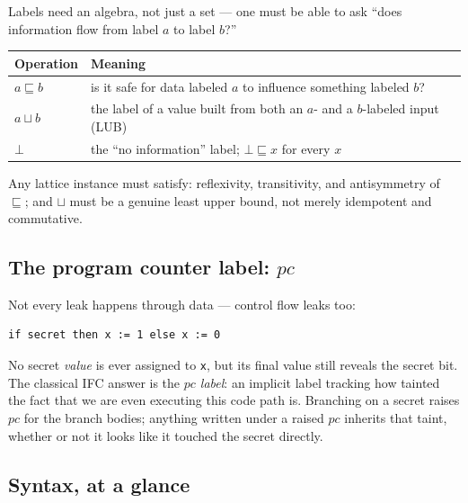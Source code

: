\documentclass[11pt, a4paper]{article}
\newcommand{\flowsto}{\sqsubseteq}
\newcommand{\joinop}{\sqcup}
\begin{document}
Labels need an algebra, not just a set --- one must be able to ask ``does
information flow from label $a$ to label $b$?''

\begin{center}
\begin{tabular}{@{}ll@{}}
\toprule
Operation & Meaning \\
\midrule
$a \flowsto b$ & is it safe for data labeled $a$ to influence something labeled $b$? \\
$a \joinop b$ & the label of a value built from both an $a$- and a $b$-labeled input (LUB) \\
$\bot$ & the ``no information'' label; $\bot \flowsto x$ for every $x$ \\
\bottomrule
\end{tabular}
\end{center}

Any lattice instance must satisfy: reflexivity, transitivity, and
antisymmetry of $\flowsto$; and $\joinop$ must be a genuine least upper
bound, not merely idempotent and commutative.

\subsection{The program counter label: \texorpdfstring{$pc$}{pc}}

Not every leak happens through data --- control flow leaks too:

\begin{lstlisting}
if secret then x := 1 else x := 0
\end{lstlisting}

No secret \emph{value} is ever assigned to \texttt{x}, but its final value
still reveals the secret bit. The classical IFC answer is the \emph{$pc$
label}: an implicit label tracking how tainted the fact that we are even
executing this code path is. Branching on a secret raises $pc$ for the
branch bodies; anything written under a raised $pc$ inherits that taint,
whether or not it looks like it touched the secret directly.

\subsection{Syntax, at a glance}
\end{document}
